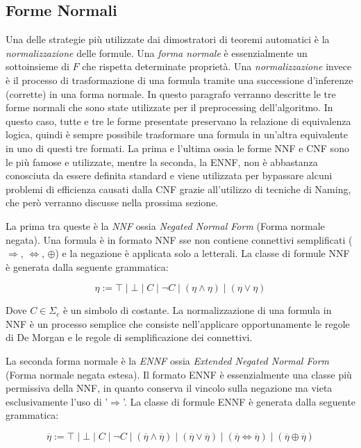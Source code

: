 \documentclass[./main.tex]{subfiles}
\begin{document}
\subsection{Forme Normali} \label{sec:forme_normali}
Una delle strategie più utilizzate dai dimostratori di teoremi automatici è la \textit{normalizzazione} delle formule. Una \textit{forma normale}
è essenzialmente un sottoinsieme di $F$ che rispetta determinate proprietà. Una \textit{normalizzazione} invece è il processo di trasformazione di una formula
tramite una successione d'inferenze (corrette) in una forma normale.
In questo paragrafo verranno descritte le tre forme normali che sono state utilizzate per il preprocessing
dell'algoritmo. In questo caso, tutte e tre le forme presentate preservano la relazione di equivalenza logica, quindi è sempre possibile
trasformare una formula in un'altra equivalente in uno di questi tre formati. 
La prima e l'ultima ossia le forme NNF e CNF sono le più famose e utilizzate, mentre la seconda, la ENNF, non è abbastanza conosciuta da essere definita standard
e viene utilizzata per bypassare alcuni problemi di efficienza causati dalla CNF grazie all'utilizzo di tecniche di Naming, che però verranno discusse nella prossima sezione.

La prima tra queste è la \textit{NNF} ossia \textit{Negated Normal Form} (Forma normale negata). Una formula è in formato NNF 
sse non contiene connettivi semplificati ($\Rightarrow$, $\Leftrightarrow$, $\oplus$) e la negazione è applicata solo a letterali. La classe di formule 
NNF è generata dalla seguente grammatica:

$$ \eta := \top \mid \bot \mid C \mid \lnot C \mid (\eta \land \eta) \mid (\eta \lor \eta ) $$

Dove $C \in \Sigma_c$ è un simbolo di costante. La normalizzazione di una formula in NNF è un processo semplice che consiste nell'applicare opportunamente 
le regole di De Morgan e le regole di semplificazione dei connettivi.

La seconda forma normale è la \textit{ENNF} ossia \textit{Extended Negated Normal Form} (Forma normale negata estesa). 
Il formato ENNF è essenzialmente una classe più permissiva della NNF, in quanto conserva il vincolo sulla negazione ma 
vieta esclusivamente l'uso di '$\Rightarrow$'. La classe di formule ENNF è generata dalla seguente grammatica:
 
$$ \overline{\eta}  := \top \mid \bot \mid C \mid \lnot C \mid (\overline{\eta} \land \overline{\eta}) \mid (\overline{\eta} \lor \overline{\eta} ) \mid (\overline{\eta} \Leftrightarrow \overline{\eta}) \mid (\overline{\eta} \oplus \overline{\eta}) $$
\end{document}
